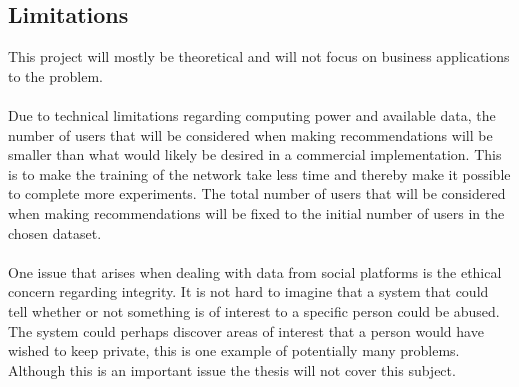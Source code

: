 \subsection{Limitations}
This project will mostly be theoretical and will not focus on business applications to the problem.
\\\\
Due  to  technical  limitations  regarding  computing  power  and  available  data,  the number of users that will be considered when making recommendations  will be smaller than what would likely be desired in a commercial implementation. This  is  to  make  the training  of  the  network  take  less  time  and  thereby make it possible to complete more experiments. The total number of users that will be considered when making recommendations will be fixed to the initial number of users in the chosen dataset.
\\\\
One issue that arises when dealing with data from social platforms is the ethical concern regarding integrity. It is not hard to imagine that a system that could tell whether or not something is of interest to a specific person could be abused. The system could perhaps discover areas of interest that a person would have wished to keep private, this is one example of potentially many problems. Although this is an important issue the thesis will not cover this subject. 